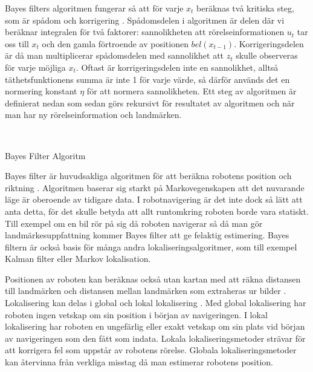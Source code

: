 Bayes filters algoritmen fungerar så att för varje $x_t$ beräknas två kritiska steg, som är spådom och korrigering \citep{ProbabilisticRobotics}. Spådomsdelen i algoritmen är delen där vi beräknar integralen för två faktorer: sannolikheten att rörelseinformationen $u_t$ tar oss till $x_t$ och den gamla förtroende av positionen $bel(x_{t-1})$. Korrigeringsdelen är då man multiplicerar spådomsdelen med sannolikhet att $z_t$ skulle observeras för varje möjliga $x_t$. Oftast är korrigeringsdelen inte en sannolikhet, alltså täthetsfunktionens summa är inte 1 för varje värde, så därför används det en normering konstant $\eta$ för att normera sannolikheten. Ett steg av algoritmen är definierat nedan som sedan görs rekursivt för resultatet av algoritmen och när man har ny rörelseinformation och landmärken.

\begin{algorithm}[H]
    \SetAlgoLined
    \label{BFA}
     \\
    \caption{Bayes Filter Algoritm}
\end{algorithm}

Bayes filter är huvudsakliga algoritmen för att beräkna robotens position och riktning \citep{ProbabilisticRobotics}. Algoritmen baserar sig starkt på Markovegenskapen att det nuvarande läge är oberoende av tidigare data. I robotnavigering är det inte dock så lätt att anta detta, för det skulle betyda att allt runtomkring roboten borde vara statiskt. Till exempel om en bil rör på sig då roboten navigerar så då man gör landmärkesuppfattning kommer Bayes filter att ge felaktig estimering. Bayes filtern är också basis för många andra lokaliseringsalgoritmer, som till exempel Kalman filter eller Markov lokalisation. 

Positionen av roboten kan beräknas också utan kartan med att räkna distansen till landmärken och distansen mellan landmärken som extraheras ur bilder \citep{realslamproblem}. Lokalisering kan delas i global och lokal lokalisering \citep{982903, globalsubmaps}. Med global lokalisering har roboten ingen vetskap om sin position i början av navigeringen. I lokal lokalisering har roboten en ungefärlig eller exakt vetskap om sin plats vid början av navigeringen som den fått som indata. Lokala lokaliseringsmetoder strävar för att korrigera fel som uppstår av robotens rörelse. Globala lokaliseringsmetoder kan återvinna från verkliga misstag då man estimerar robotens position.

